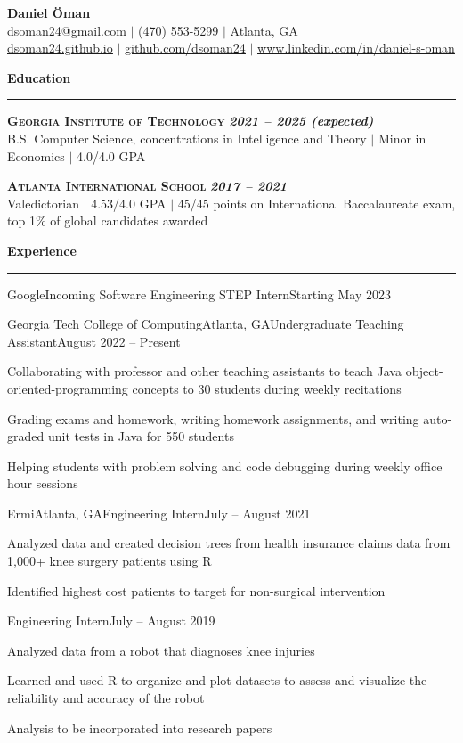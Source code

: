 \documentclass{article}
\newcommand{\horizontal}{\vspace{3pt}\hrule}
\newcommand{\school}[3]{\vspace{3pt}\textsc{\textbf{#1}} \hfill \textbf{\textit{#2}} \\ #3}
\newcommand{\sectitle}[1]{\vspace{3pt} \textbf{\large #1} \horizontal}
\begin{document}
\thispagestyle{empty}
\begin{center}
    \textbf{\LARGE Daniel Öman} \\
    dsoman24@gmail.com $|$ (470) 553-5299 $|$ Atlanta, GA \\
    \underline{\href{https://dsoman24.github.io/}{dsoman24.github.io}} $|$ \underline{\href{https://github.com/dsoman24}{github.com/dsoman24}} $|$ \underline{\href{https://www.linkedin.com/in/daniel-s-oman/}{www.linkedin.com/in/daniel-s-oman}}
\end{center}

\begin{flushleft}
\sectitle{Education}

\school{Georgia Institute of Technology}{2021 -- 2025 (expected)}
{B.S. Computer Science, concentrations in Intelligence and Theory $|$ Minor in Economics $|$ 4.0/4.0 GPA}

\school{Atlanta International School}{2017 -- 2021}
{Valedictorian $|$ 4.53/4.0 GPA $|$ 45/45 points on International Baccalaureate exam, top 1\% of global candidates awarded}

\sectitle{Experience}

    \begin{experience_no_list}{Google}{}{Incoming Software Engineering STEP Intern}{Starting May 2023}
    \end{experience_no_list}

    \begin{experience}{Georgia Tech College of Computing}{Atlanta, GA}{Undergraduate Teaching Assistant}{August 2022 -- Present}
        \item Collaborating with professor and other teaching assistants to teach Java object-oriented-programming concepts to 30 students during weekly recitations
        \item Grading exams and homework, writing homework assignments, and writing auto-graded unit tests in Java for 550 students
        \item Helping students with problem solving and code debugging during weekly office hour sessions
    \end{experience}

    \begin{experience}{Ermi}{Atlanta, GA}{Engineering Intern}{July -- August 2021}
        \item Analyzed data and created decision trees from health insurance claims data from 1,000+ knee surgery patients using R
        \item Identified highest cost patients to target for non-surgical intervention
    \end{experience}
    \begin{subexperience}{Engineering Intern}{July -- August 2019}
        \item Analyzed data from a robot that diagnoses knee injuries
        \item Learned and used R to organize and plot datasets to assess and visualize the reliability and accuracy of the robot
        \item Analysis to be incorporated into research papers
    \end{subexperience}


\end{flushleft}
\end{document}
